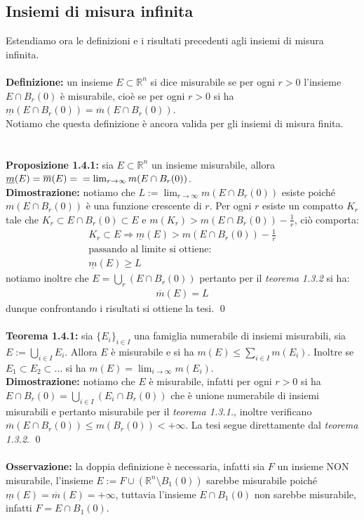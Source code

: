 \documentclass{article}
\numberwithin{equation}{subsection}
\begin{document}
\subsection{Insiemi di misura infinita}
Estendiamo ora le definizioni e i risultati precedenti agli insiemi di misura infinita.\\ \\
\textbf{Definizione:} un insieme $E \subset \mathbb{R}^n$ si dice misurabile se per ogni $r > 0$ l'insieme $E \cap B_r(0)$ è misurabile, cioè se per ogni $r > 0$ si ha $\underline{m}(E \cap B_r(0)) = \overline{m}(E \cap B_r(0))$. \\
Notiamo che questa definizione è ancora valida per gli insiemi di misura finita. \\ \\ \\
\textbf{Proposizione 1.4.1:} sia $E \subset \mathbb{R}^n$ un insieme misurabile, allora $\underline{m}(E) = \overline{m}(E) = \\ = \lim_{r \rightarrow \infty} m(E \cap B_r(0))$. \\

\textbf{Dimostrazione:} notiamo che $L := \lim_{r \rightarrow \infty} m(E \cap B_r(0))$ esiste poiché $m(E \cap B_r(0))$ è una funzione crescente di $r$. Per ogni $r$ esiste un compatto $K_r$ tale che $K_r \subset E \cap B_r(0) \subset E$ e $m(K_r) > m(E \cap B_r(0)) - \frac{1}{r}$, ciò comporta:
\begin{gather*}
    K_r \subset E \Rightarrow \underline{m}(E) > m(E \cap B_r(0)) - \frac{1}{r}  \\
    \text{passando al limite si ottiene:}  \\
    \underline{m}(E) \geq L 
\end{gather*}
notiamo inoltre che $E = \bigcup_r (E \cap B_r(0))$ pertanto per il \textit{teorema 1.3.2} si ha:
\begin{gather*}
    \overline{m}(E) = L 
\end{gather*}
dunque confrontando i risultati si ottiene la tesi. \qed \\ \\
\textbf{Teorema 1.4.1:} sia $\{ E_i \}_{i \in I}$ una famiglia numerabile di insiemi misurabili, sia $E := \bigcup_{i \in I} E_i$. Allora $E$ è misurabile e si ha $m(E) \leq \sum_{i \in I} m(E_i)$. Inoltre se $E_1 \subset E_2 \subset \dots$ si ha $m(E) = \lim_{i \rightarrow \infty} m(E_i)$. \\

\textbf{Dimostrazione:} notiamo che $E$ è misurabile, infatti per ogni $r > 0$ si ha $E \cap B_r(0) = \bigcup_{i \in I} (E_i \cap B_r(0))$ che è unione numerabile di insiemi misurabili e pertanto misurabile per il \textit{teorema 1.3.1.}, inoltre verificano $\overline{m}(E \cap B_r(0)) \leq m(B_r(0)) < + \infty$. La tesi segue direttamente dal \textit{teorema 1.3.2}. \qed \\ \\
\textbf{Osservazione:} la doppia definizione è necessaria, infatti sia $F$ un insieme NON misurabile, l'insieme $E := F \cup (\mathbb{R}^n \setminus B_1(0))$ sarebbe misurabile poiché $\underline{m}(E) = \overline{m}(E) = + \infty$, tuttavia l'insieme $E \cap B_1(0)$ non sarebbe misurabile, infatti $F = E \cap B_1(0)$.
\end{document}
